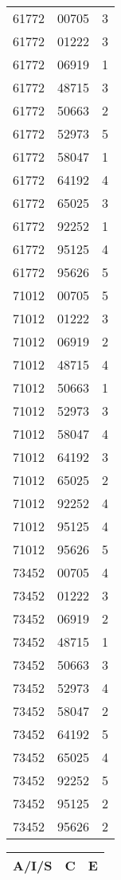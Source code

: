 {{\begin{tabular}{|c|c|c|}
61772&00705&3\\ 61772&01222&3\\ 61772&06919&1\\ 61772&48715&3\\ 61772&50663&2\\ 61772&52973&5\\ 61772&58047&1\\ 61772&64192&4\\ 61772&65025&3\\ 61772&92252&1\\ 61772&95125&4\\ 61772&95626&5\\ 71012&00705&5\\ 71012&01222&3\\ 71012&06919&2\\ 71012&48715&4\\ 71012&50663&1\\ 71012&52973&3\\ 71012&58047&4\\ 71012&64192&3\\ 71012&65025&2\\ 71012&92252&4\\ 71012&95125&4\\ 71012&95626&5\\ 73452&00705&4\\ 73452&01222&3\\ 73452&06919&2\\ 73452&48715&1\\ 73452&50663&3\\ 73452&52973&4\\ 73452&58047&2\\ 73452&64192&5\\ 73452&65025&4\\ 73452&92252&5\\ 73452&95125&2\\ 73452&95626&2\\ 
		\hline
		\end{tabular}
		\quad
		\begin{tabular}{|c|c|c|}
		\hline
		\bf A/I/S & \bf C & \bf E \\
		\hline

\end{tabular}}}
